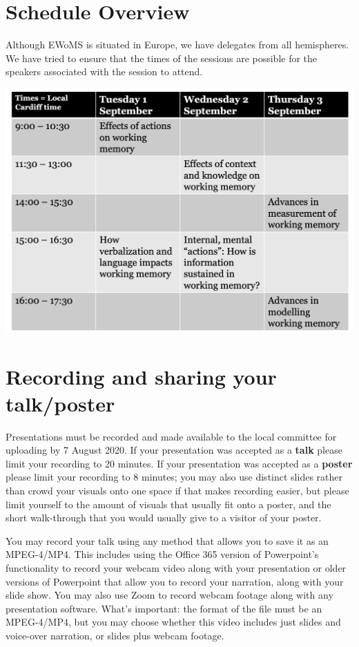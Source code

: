 \documentclass[
  12pt,
]{book}
\begin{document}
\hypertarget{schedule-overview}{%
\section{Schedule Overview}\label{schedule-overview}}

Although EWoMS is situated in Europe, we have delegates from all hemispheres. We have tried to ensure that the times of the sessions are possible for the speakers associated with the session to attend.

\includegraphics{ewomsSched.png}

\hypertarget{recording-and-sharing-your-talkposter}{%
\section{Recording and sharing your talk/poster}\label{recording-and-sharing-your-talkposter}}

Presentations must be recorded and made available to the local committee for uploading by 7 August 2020. If your presentation was accepted as a \textbf{talk} please limit your recording to 20 minutes. If your presentation was accepted as a \textbf{poster} please limit your recording to 8 minutes; you may also use distinct slides rather than crowd your visuals onto one space if that makes recording easier, but please limit yourself to the amount of visuals that usually fit onto a poster, and the short walk-through that you would usually give to a visitor of your poster.

You may record your talk using any method that allows you to save it as an MPEG-4/MP4. This includes using the Office 365 version of Powerpoint's functionality to record your webcam video along with your presentation or older versions of Powerpoint that allow you to record your narration, along with your slide show. You may also use Zoom to record webcam footage along with any presentation software. What's important: the format of the file must be an MPEG-4/MP4, but you may choose whether this video includes just slides and voice-over narration, or slides plus webcam footage.
\end{document}
